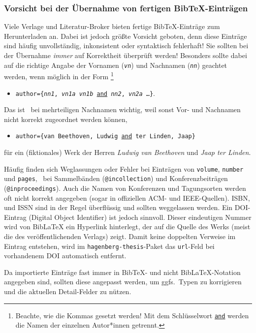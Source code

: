 \subsubsection{Vorsicht bei der Übernahme von fertigen BibTeX-Einträgen}

Viele Verlage und Literatur-Broker bieten fertige BibTeX-Einträge zum
Herunterladen an. Dabei ist jedoch größte Vorsicht geboten, denn diese
Einträge sind häufig unvollständig, inkonsistent oder syntaktisch fehlerhaft!
Sie sollten bei der Übernahme \emph{immer} auf Korrektheit überprüft werden!
Besonders sollte dabei auf die richtige Angabe der Vornamen
(\texttt{\textit{vn}}) und Nachnamen (\texttt{\textit{nn}}) geachtet werden,
wenn möglich in der Form%
\footnote{Beachte, wie die Kommas gesetzt werden! Mit dem Schlüsselwort
\underline{\texttt{and}} werden die Namen der einzelnen Autor*innen getrennt.}
%
\begin{itemize}
\item[]
\texttt{author=\{\textit{nn1}, \textit{vn1a} \emph{vn1b} \underline{and}
\textit{nn2}, \textit{vn2a} \ldots \}}.
\end{itemize}
%
Das ist \va\ bei mehrteiligen Nachnamen wichtig, weil sonst Vor- und
Nachnamen nicht korrekt zugeordnet werden können, \zB
%
\begin{itemize}
\item[]
\texttt{author=\{van Beethoven, Ludwig \underline{and} ter Linden, Jaap\}}
\end{itemize}
%
für ein (fiktionales) Werk der Herren \emph{Ludwig van Beethoven} und
\emph{Jaap ter Linden}.

Häufig finden sich Weglassungen oder Fehler bei Einträgen von
\texttt{volume}, \texttt{number} und \texttt{pages}, \va\ bei Sammelbänden
(\texttt{@incollection}) und Konferenzbeiträgen (\texttt{@inproceedings}).
Auch die Namen von Konferenzen und Tagungsorten werden oft nicht korrekt
angegeben (sogar in offiziellen ACM- und IEEE-Quellen). ISBN, und
ISSN sind in der Regel überflüssig und sollten weggelassen werden.
Ein DOI-Eintrag (Digital Object Identifier) ist jedoch sinnvoll. Dieser
eindeutigen Nummer wird von BibLaTeX ein Hyperlink hinterlegt, der auf die
Quelle des Werks (meist die des veröffentlichenden Verlags) zeigt. Damit
keine doppelten Verweise im Eintrag entstehen, wird im
\texttt{hagenberg-thesis}-Paket das \texttt{url}-Feld bei vorhandenem DOI
automatisch entfernt.

Da importierte Einträge fast immer in BibTeX- und nicht BibLaTeX-Notation
angegeben sind, sollten diese angepasst werden, um ggfs.\ Typen zu
korrigieren und die aktuellen Detail-Felder zu nützen.


